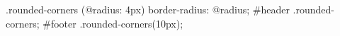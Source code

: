 .rounded-corners (@radius: 4px) {
   border-radius: @radius;
}
#header {.rounded-corners;}
#footer {.rounded-corners(10px);}
